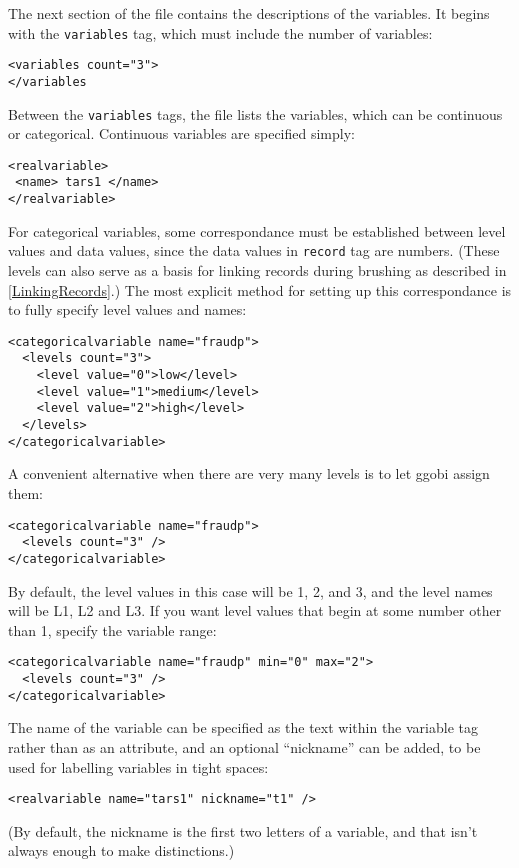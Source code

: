\documentclass{article}
\begin{document}
The next section of the file contains the descriptions of
the variables.  It begins with the \texttt{variables} tag,
which must include the number of variables:

\begin{verbatim}
<variables count="3">
</variables
\end{verbatim}
%
Between the \texttt{variables} tags, the file lists the variables,
which can be continuous or categorical.  Continuous variables are
specified simply:
\begin{verbatim}
<realvariable>
 <name> tars1 </name>
</realvariable>
\end{verbatim}

% 
For categorical variables, some correspondance must be established
between level values and data values, since the data values in
\texttt{record} tag are numbers.  (These
levels can also serve as a basis for linking records during brushing
as described in \ref{LinkingRecords}.)  The most explicit method
for setting up this correspondance is to fully specify level values and
names:
\begin{verbatim}
<categoricalvariable name="fraudp">
  <levels count="3">
    <level value="0">low</level>
    <level value="1">medium</level>
    <level value="2">high</level>
  </levels>
</categoricalvariable>
\end{verbatim}
A convenient alternative when there are very many levels is to
let ggobi assign them:
\begin{verbatim}
<categoricalvariable name="fraudp">
  <levels count="3" />
</categoricalvariable>
\end{verbatim}
By default, the level values in this case will be 1, 2, and 3, and
the level names will be L1, L2 and L3.  If you want level values
that begin at some number other than 1, specify the variable range: 
\begin{verbatim}
<categoricalvariable name="fraudp" min="0" max="2">
  <levels count="3" />
</categoricalvariable>
\end{verbatim}

The name of the variable can be specified as the text within the
variable tag rather than as an attribute, and an optional ``nickname''
can be added, to be used for labelling variables in tight spaces:
\begin{verbatim}
<realvariable name="tars1" nickname="t1" />
\end{verbatim}

(By default, the nickname is the first two letters of a variable,
and that isn't always enough to make distinctions.)
\end{document}
